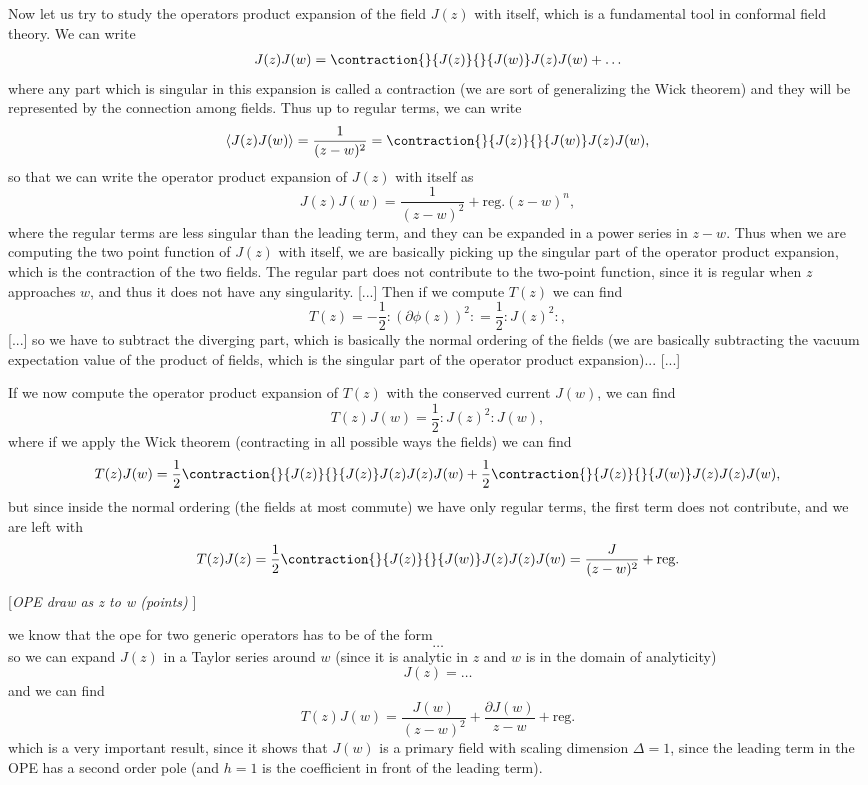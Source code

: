 Now let us try to study the operators product expansion of the field \(J(z)\) with itself, which is a fundamental tool in conformal field theory. We can write
\[
    \begin{aligned}
        J(z)J(w) = \contraction{}{J(z)}{}{J(w)} J(z) J(w) + \dots
    \end{aligned}
\]
where any part which is singular in this expansion is called a contraction (we are sort of generalizing the Wick theorem) and they will be represented by the connection among fields.
Thus up to regular terms, we can write
\[
    \langle J(z)J(w) \rangle = \frac{1}{(z-w)^2} = \contraction{}{J(z)}{}{J(w)} J(z) J(w),
\]
so that we can write the operator product expansion of \(J(z)\) with itself as
\[
    J(z)J(w) = \frac{1}{(z-w)^2} + \text{reg.}(z-w)^n,
\]
where the regular terms are less singular than the leading term, and they can be expanded in a power series in \(z-w\). Thus when we are computing the two point function of \(J(z)\) with itself, we are basically picking up the singular part of the operator product expansion, which is the contraction of the two fields. The regular part does not contribute to the two-point function, since it is regular when \(z\) approaches \(w\), and thus it does not have any singularity.
[...]
Then if we compute \(T(z)\) we can find
\[
    T(z) = - \frac{1}{2} : (\partial \phi(z))^2 : = \frac{1}{2} : J(z)^2 :,
\]
[...]
so we have to subtract the diverging part, which is basically the normal ordering of the fields (we are basically subtracting the vacuum expectation value of the product of fields, which is the singular part of the operator product expansion)...
    [...]

If we now compute the operator product expansion of \(T(z)\) with the conserved current \(J(w)\), we can find
\[
    T(z)J(w) = \frac{1}{2} : J(z)^2 : J(w),
\]
where if we apply the Wick theorem (contracting in all possible ways the fields) we can find
\[
    T(z)J(w) = \frac{1}{2} \contraction{}{J(z)}{}{J(z)} J(z) J(z) J(w) + \frac{1}{2} \contraction{}{J(z)}{}{J(w)} J(z) J(z) J(w),
\]
but since inside the normal ordering (the fields at most commute) we have only regular terms, the first term does not contribute, and we are left with
\[
    T(z)J(z) = \frac{1}{2} \contraction{}{J(z)}{}{J(w)} J(z) J(z) J(w) = \frac{J}{(z-w)^2} + \text{reg.}
\]

[\textit{OPE draw as z to w (points) }]

we know that the ope for two generic operators has to be of the form
\[
    \dots
\]
so we can expand \(J(z)\) in a Taylor series around \(w\) (since it is analytic in \(z\) and \(w\) is in the domain of analyticity)
\[
    J(z) = \dots
\]
and we can find
\[
    T(z)J(w) = \frac{J(w)}{(z-w)^2} + \frac{\partial J(w)}{z - w} + \text{reg.}
\]
which is a very important result, since it shows that \(J(w)\) is a primary field with scaling dimension \(\Delta = 1\), since the leading term in the OPE has a second order pole (and \(h=1\) is the coefficient in front of the leading term).

